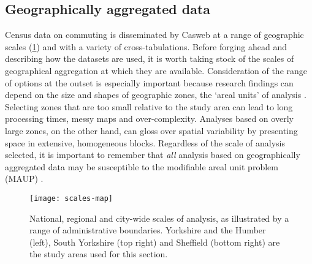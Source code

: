 \subsection{Geographically aggregated data} %
\label{sgeoaggdata}
Census data on commuting is disseminated by Casweb at a range of geographic
scales (\cref{f:scales}) and with a variety of cross-tabulations. Before
forging ahead and describing how the datasets are used, it is worth taking stock
of the scales of geographical aggregation at which they are available.
Consideration of the range
of options at the outset is especially important because research
findings can depend on the size and shapes of geographic zones,
the `areal units' of analysis \citep{Horner2002, Openshaw1983}. Selecting zones
that are too small relative to the study  
area can lead to long processing times, messy maps and over-complexity.
Analyses based on overly large zones, on the other hand, can gloss over
spatial variability by presenting space in extensive, homogeneous blocks.
Regardless of the scale of analysis selected, it is important to remember that
\emph{all} analysis based on geographically aggregated data may be susceptible
to the modifiable areal unit problem (MAUP) \citep{Wong2009}.

\begin{figure}
\texttt{[image: scales-map]}
\caption[National, regional and city-wide scales of analysis]{National, regional
and city-wide scales of analysis, as illustrated
by a range of administrative boundaries. Yorkshire and the Humber (left),
South Yorkshire (top right) and Sheffield (bottom right)
are the study areas used for this section.}
\label{f:scales}
\end{figure}

